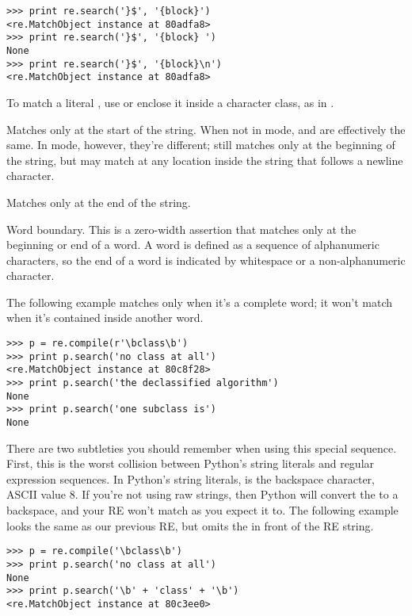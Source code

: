 \documentclass{howto}
\begin{document}
\begin{list}{}{}
\begin{verbatim}
>>> print re.search('}$', '{block}')
<re.MatchObject instance at 80adfa8>
>>> print re.search('}$', '{block} ')
None
>>> print re.search('}$', '{block}\n')
<re.MatchObject instance at 80adfa8>
\end{verbatim}

To match a literal \character{\$}, use \regexp{\e\$} or enclose it
inside a character class, as in  \regexp{[\$]}.

\item[\regexp{\e A}] Matches only at the start of the string.  When
not in  mode,  and \regexp{\^} are
effectively the same.  In  mode, however, they're
different;  still matches only at the beginning of the
string, but \regexp{\^} may match at any location inside the string
that follows a newline character.

\item[\regexp{\e Z}]Matches only at the end of the string.  

\item[\regexp{\e b}] Word boundary.  
This is a zero-width assertion that matches only at the
beginning or end of a word.  A word is defined as a sequence of
alphanumeric characters, so the end of a word is indicated by
whitespace or a non-alphanumeric character.  

The following example matches  only when it's a complete
word; it won't match when it's contained inside another word.

\begin{verbatim}
>>> p = re.compile(r'\bclass\b')
>>> print p.search('no class at all')
<re.MatchObject instance at 80c8f28>
>>> print p.search('the declassified algorithm')
None
>>> print p.search('one subclass is')
None
\end{verbatim}

There are two subtleties you should remember when using this special
sequence.  First, this is the worst collision between Python's string
literals and regular expression sequences.  In Python's string
literals,  is the backspace character, ASCII value 8.  If
you're not using raw strings, then Python will convert the  to
a backspace, and your RE won't match as you expect it to.  The
following example looks the same as our previous RE, but omits
the  in front of the RE string.

\begin{verbatim}
>>> p = re.compile('\bclass\b')
>>> print p.search('no class at all')
None
>>> print p.search('\b' + 'class' + '\b')  
<re.MatchObject instance at 80c3ee0>
\end{verbatim}


\end{list}
\end{document}
